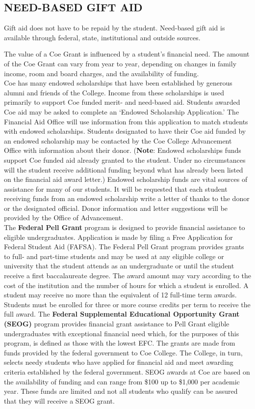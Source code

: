 \documentclass[
  letterpaper,
]{scrbook}
\begin{document}
\subsection{NEED-BASED GIFT AID}\label{need-based-gift-aid}

Gift aid does not have to be repaid by the student. Need-based gift aid
is available through federal, state, institutional and outside sources.

The value of a Coe Grant is influenced by a student's financial need.
The amount of the Coe Grant can vary from year to year, depending on
changes in family income, room and board charges, and the availability
of funding.\\
Coe has many endowed scholarships that have been established by generous
alumni and friends of the College. Income from these scholarships is
used primarily to support Coe funded merit- and need-based aid. Students
awarded Coe aid may be asked to complete an `Endowed Scholarship
Application.' The Financial Aid Office will use information from this
application to match students with endowed scholarships. Students
designated to have their Coe aid funded by an endowed scholarship may be
contacted by the Coe College Advancement Office with information about
their donor. (\textbf{Note}: Endowed scholarships funds support Coe
funded aid already granted to the student. Under no circumstances will
the student receive additional funding beyond what has already been
listed on the financial aid award letter.) Endowed scholarship funds are
vital sources of assistance for many of our students. It will be
requested that each student receiving funds from an endowed scholarship
write a letter of thanks to the donor or the designated official. Donor
information and letter suggestions will be provided by the Office of
Advancement.\\
The \textbf{Federal Pell Grant} program is designed to provide financial
assistance to eligible undergraduates. Application is made by filing a
Free Application for Federal Student Aid (FAFSA). The Federal Pell Grant
program provides grants to full- and part-time students and may be used
at any eligible college or university that the student attends as an
undergraduate or until the student receive a first baccalaureate degree.
The award amount may vary according to the cost of the institution and
the number of hours for which a student is enrolled. A student may
receive no more than the equivalent of 12 full-time term awards.
Students must be enrolled for three or more course credits per term to
receive the full award. The \textbf{Federal Supplemental Educational
Opportunity Grant (SEOG)} program provides financial grant assistance to
Pell Grant eligible undergraduates with exceptional financial need
which, for the purposes of this program, is defined as those with the
lowest EFC. The grants are made from funds provided by the federal
government to Coe College. The College, in turn, selects needy students
who have applied for financial aid and meet awarding criteria
established by the federal government. SEOG awards at Coe are based on
the availability of funding and can range from \$100 up to \$1,000 per
academic year. These funds are limited and not all students who qualify
can be assured that they will receive a SEOG grant.
\end{document}
